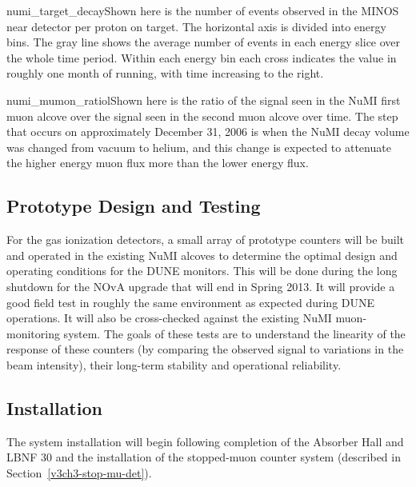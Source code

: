 \begin{cdrfigure}{numi_target_decay}{Shown here is the number of events observed in the MINOS near detector per proton on target.  The horizontal axis is divided into energy bins.  The gray line shows the average number of events in each energy slice over the whole time period.  Within each energy bin each cross indicates the value in roughly one month of running, with time increasing to the right.}
\end{cdrfigure}


\begin{cdrfigure}{numi_mumon_ratio}{lShown here is the ratio of the signal seen in 
the NuMI first muon alcove over the signal seen in the second muon alcove over time.  The step that occurs on approximately  December 31, 2006 is when the NuMI decay volume was changed from vacuum to helium, and this change is expected to attenuate the higher energy muon flux more than the lower energy flux.}
\end{cdrfigure}

\subsection{Prototype Design and Testing}

For the gas ionization detectors, a small array of prototype
counters will be built and operated in the existing NuMI
alcoves to determine the optimal design and operating conditions for
the DUNE monitors. This will be done during the long
shutdown for the NOvA upgrade that will end in Spring 2013. 
It will provide a good field test in roughly the same environment as expected during DUNE
operations. It will also be cross-checked against the existing NuMI
muon-monitoring system.  The goals of these tests are to understand the linearity of the response of these counters (by comparing the observed signal to variations in the beam intensity), their long-term stability and operational reliability.  

\subsection{Installation}

The system installation will begin following completion of the
Absorber Hall and LBNF 30
and the installation of the stopped-muon counter system
(described in Section~\ref{v3ch3-stop-mu-det}).

